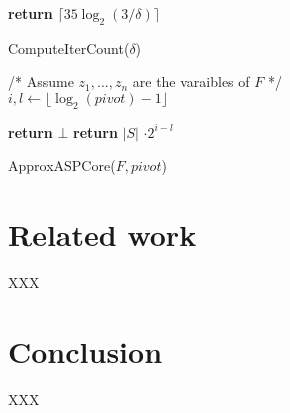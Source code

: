 \documentclass{article}
\begin{document}
\begin{algorithm}
	\textbf{return} $\lceil 35 \log_2 (3/\delta) \rceil$
	\caption{ComputeIterCount($\delta$)}
\end{algorithm}

\begin{algorithm}
	/* Assume $z_1 , ..., z_n $ are the varaibles of $F$ */ \\
	$ i, l \gets \lfloor \log_2 (pivot) - 1 \rfloor$ \\
	


	{\textbf{return} $\bot$}
	{\textbf{return} $|S|$ $\cdot 2^{i-l}$}



	\caption{ApproxASPCore($F, pivot$)}
\end{algorithm}




\section{Related work} \label{sec:relwork}
XXX

\section{Conclusion} \label{sec:conclusion}
XXX



\end{document}
